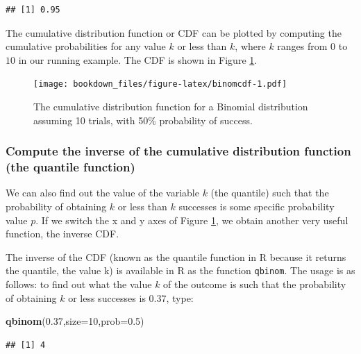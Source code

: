 \documentclass[12pt,]{krantz}
\newenvironment{Shaded}{\begin{snugshade}}{\end{snugshade}}
\newcommand{\DataTypeTok}[1]{\textcolor[rgb]{0.13,0.29,0.53}{#1}}
\newcommand{\DecValTok}[1]{\textcolor[rgb]{0.00,0.00,0.81}{#1}}
\newcommand{\FloatTok}[1]{\textcolor[rgb]{0.00,0.00,0.81}{#1}}
\newcommand{\KeywordTok}[1]{\textcolor[rgb]{0.13,0.29,0.53}{\textbf{#1}}}
\newcommand{\NormalTok}[1]{#1}
\theoremstyle{definition}
\theoremstyle{definition}
\theoremstyle{definition}
\theoremstyle{remark}
\begin{document}
\begin{verbatim}
## [1] 0.95
\end{verbatim}

The cumulative distribution function or CDF can be plotted by computing the cumulative probabilities for any value \(k\) or less than \(k\), where \(k\) ranges from \(0\) to \(10\) in our running example. The CDF is shown in Figure \ref{fig:binomcdf}.

\begin{figure}
\centering
\texttt{[image: bookdown\_files/figure-latex/binomcdf-1.pdf]}
\caption{\label{fig:binomcdf}The cumulative distribution function for a Binomial distribution assuming 10 trials, with 50\% probability of success.}
\end{figure}

\hypertarget{compute-the-inverse-of-the-cumulative-distribution-function-the-quantile-function}{%
\subsubsection{Compute the inverse of the cumulative distribution function (the quantile function)}\label{compute-the-inverse-of-the-cumulative-distribution-function-the-quantile-function}}

We can also find out the value of the variable \(k\) (the quantile) such that the probability of obtaining \(k\) or less than \(k\) successes is some specific probability value \(p\). If we switch the x and y axes of Figure \ref{fig:binomcdf}, we obtain another very useful function, the inverse CDF.

The inverse of the CDF (known as the quantile function in R because it returns the quantile, the value k) is available in R as the function \texttt{qbinom}. The usage is as follows: to find out what the value \(k\) of the outcome is such that the probability of obtaining \(k\) or less successes is \(0.37\), type:

\begin{Shaded}
\begin{Highlighting}[]
\KeywordTok{qbinom}\NormalTok{(}\FloatTok{0.37}\NormalTok{,}\DataTypeTok{size=}\DecValTok{10}\NormalTok{,}\DataTypeTok{prob=}\FloatTok{0.5}\NormalTok{)}
\end{Highlighting}
\end{Shaded}

\begin{verbatim}
## [1] 4
\end{verbatim}
\end{document}

